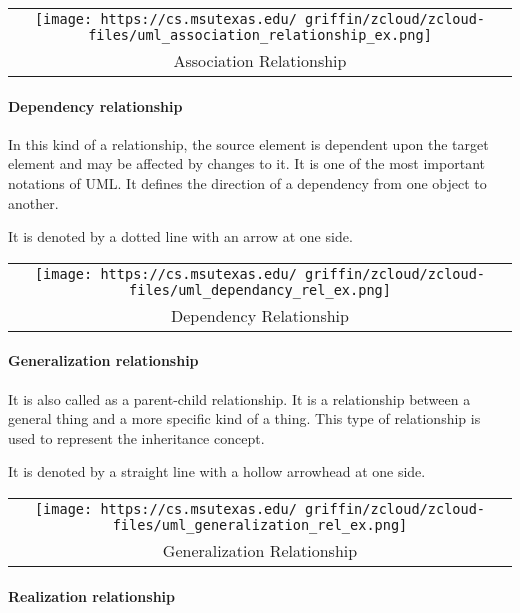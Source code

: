\documentclass[
]{article}
\begin{document}
\begin{longtable}[]{@{}c@{}}
\toprule
\endhead
\texttt{[image: https://cs.msutexas.edu/~griffin/zcloud/zcloud-files/uml\_association\_relationship\_ex.png]}\tabularnewline
Association Relationship\tabularnewline
\bottomrule
\end{longtable}

\hypertarget{dependency-relationship}{%
\paragraph{Dependency relationship}\label{dependency-relationship}}

In this kind of a relationship, the source element is dependent upon the
target element and may be affected by changes to it. It is one of the
most important notations of UML. It defines the direction of a
dependency from one object to another.

It is denoted by a dotted line with an arrow at one side.

\begin{longtable}[]{@{}c@{}}
\toprule
\endhead
\texttt{[image: https://cs.msutexas.edu/~griffin/zcloud/zcloud-files/uml\_dependancy\_rel\_ex.png]}\tabularnewline
Dependency Relationship\tabularnewline
\bottomrule
\end{longtable}

\hypertarget{generalization-relationship}{%
\paragraph{Generalization
relationship}\label{generalization-relationship}}

It is also called as a parent-child relationship. It is a relationship
between a general thing and a more specific kind of a thing. This type
of relationship is used to represent the inheritance concept.

It is denoted by a straight line with a hollow arrowhead at one side.

\begin{longtable}[]{@{}c@{}}
\toprule
\endhead
\texttt{[image: https://cs.msutexas.edu/~griffin/zcloud/zcloud-files/uml\_generalization\_rel\_ex.png]}\tabularnewline
Generalization Relationship\tabularnewline
\bottomrule
\end{longtable}

\hypertarget{realization-relationship}{%
\paragraph{Realization relationship}\label{realization-relationship}}
\end{document}

